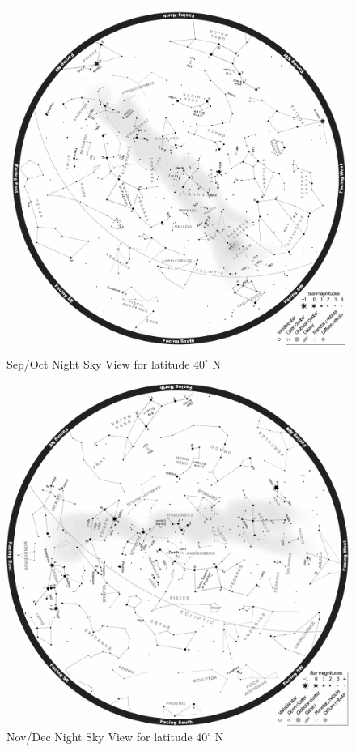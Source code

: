 \documentclass[a4paper,12pt]{extarticle}
\begin{document}
\clearpage
\begin{figure}
    \centering
    \includegraphics[width=0.9 \linewidth]{sep-oct.png}
    \caption{Sep/Oct Night Sky View for latitude $40^\circ$ N}
\end{figure}
\clearpage
\begin{figure}
    \centering
    \includegraphics[width=0.9 \linewidth]{nov-dec.png}
    \caption{Nov/Dec Night Sky View for latitude $40^\circ$ N}
\end{figure}
\end{document}
